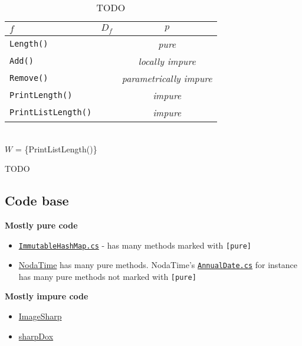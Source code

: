 \documentclass[a4paper,12pt]{article}
\begin{document}
\begin{table}[H]
  \caption{TODO}
  \label{tab:lookup-table3}
  \centering
  \begin{tabular}{|l|c|c|}
    \hline
    $f$                        & $D_f$                  & $p$                     \\ \hline
    \texttt{Length()}          &                        & \textit{pure}                  \\
    \texttt{Add()}             &                        & \textit{locally impure}        \\
    \texttt{Remove()}          &                        & \textit{parametrically impure} \\
    \texttt{PrintLength()}     &                        & \textit{impure}                \\
    \texttt{PrintListLength()} &                        & \textit{impure}                \\ \hline
  \end{tabular}
  \\
  $W$ = \{PrintListLength()\}
\end{table}

TODO

\subsection{Code base} \label{sub:Code base}
\textbf{Mostly pure code}
\begin{itemize}
  \item \href{https://github.com/dotnet/roslyn/blob/master/src/Workspaces/SharedUtilitiesAndExtensions/Compiler/Core/Utilities/CompilerUtilities/ImmutableHashMap.cs}{\texttt{ImmutableHashMap.cs}} - has many methods marked with \texttt{[pure]}
  \item \href{https://github.com/nodatime/nodatime/blob/master/src/NodaTime}{NodaTime} has many pure methods. NodaTime's \href{https://github.com/nodatime/nodatime/blob/master/src/NodaTime/AnnualDate.cs}{\texttt{AnnualDate.cs}} for instance has many pure methods not marked with \texttt{[pure]}
\end{itemize}

\textbf{Mostly impure code}
\begin{itemize}
  \item \href{https://github.com/SixLabors/ImageSharp/blob/master/src/ImageSharp}{ImageSharp}
  \item \href{https://github.com/geaz/sharpDox}{sharpDox}
\end{itemize}
\end{document}
